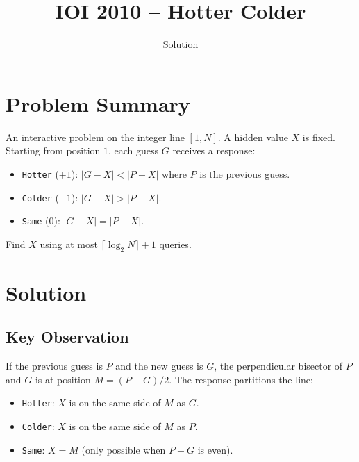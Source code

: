 \documentclass[11pt,a4paper]{article}
\title{IOI 2010 -- Hotter Colder}
\author{Solution}
\date{}
\begin{document}
\maketitle

\section{Problem Summary}
An interactive problem on the integer line $[1, N]$. A hidden value $X$ is fixed. Starting from position $1$, each guess $G$ receives a response:
\begin{itemize}
    \item \texttt{Hotter} ($+1$): $|G - X| < |P - X|$ where $P$ is the previous guess.
    \item \texttt{Colder} ($-1$): $|G - X| > |P - X|$.
    \item \texttt{Same} ($0$): $|G - X| = |P - X|$.
\end{itemize}
Find $X$ using at most $\lceil \log_2 N \rceil + 1$ queries.

\section{Solution}

\subsection{Key Observation}
If the previous guess is $P$ and the new guess is $G$, the perpendicular bisector of $P$ and $G$ is at position $M = (P + G) / 2$. The response partitions the line:
\begin{itemize}
    \item \texttt{Hotter}: $X$ is on the same side of $M$ as $G$.
    \item \texttt{Colder}: $X$ is on the same side of $M$ as $P$.
    \item \texttt{Same}: $X = M$ (only possible when $P + G$ is even).
\end{itemize}
\end{document}
